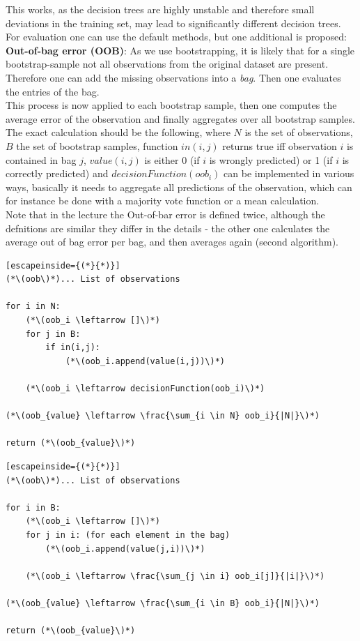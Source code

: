 \documentclass[12pt,a4paper]{article}
\begin{document}
\noindent This works, as the decision trees are highly unstable and therefore small deviations in the training set, may lead to significantly different decision trees.\\
For evaluation one can use the default methods, but one additional is proposed:\\[1em]
\textbf{Out-of-bag error (OOB)}: As we use bootstrapping, it is likely that for a single bootstrap-sample not all observations from the original dataset are present. Therefore one can add the missing observations into a \textit{bag}. Then one evaluates the entries of the bag.\\
This process is now applied to each bootstrap sample, then one computes the average error of the observation and finally aggregates over all bootstrap samples.\\[1em]
The exact calculation should be the following, where \(N\) is the set of observations, \(B\) the set of bootstrap samples, function \(in(i,j)\) returns true iff observation \(i\) is contained in bag \(j\), \(value(i,j)\) is either 0 (if \(i\) is wrongly predicted) or 1 (if \(i\) is correctly predicted) and \(decisionFunction(oob_i)\) can be implemented in various ways, basically it needs to aggregate all predictions of the observation, which can for instance be done with a majority vote function or a mean calculation.\\
Note that in the lecture the Out-of-bar error is defined twice, although the defnitions are similar they differ in the details - the other one calculates the average out of bag error per bag, and then averages again (second algorithm).

\begin{lstlisting}[escapeinside={(*}{*)}]
(*\(oob\)*)... List of observations

for i in N:
    (*\(oob_i \leftarrow []\)*)
    for j in B:
        if in(i,j):
            (*\(oob_i.append(value(i,j))\)*)

    (*\(oob_i \leftarrow decisionFunction(oob_i)\)*)

(*\(oob_{value} \leftarrow \frac{\sum_{i \in N} oob_i}{|N|}\)*)
    
return (*\(oob_{value}\)*)

\end{lstlisting}


\begin{lstlisting}[escapeinside={(*}{*)}]
(*\(oob\)*)... List of observations

for i in B:
    (*\(oob_i \leftarrow []\)*)
    for j in i: (for each element in the bag)
        (*\(oob_i.append(value(j,i))\)*)

    (*\(oob_i \leftarrow \frac{\sum_{j \in i} oob_i[j]}{|i|}\)*)

(*\(oob_{value} \leftarrow \frac{\sum_{i \in B} oob_i}{|N|}\)*)
    
return (*\(oob_{value}\)*)

\end{lstlisting}
\end{document}
